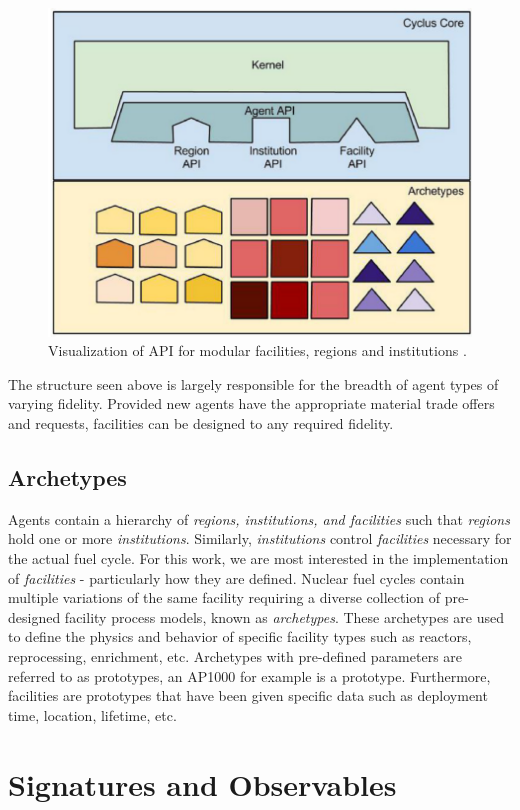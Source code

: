\begin{figure}
	\centering
	\includegraphics[width=0.7\linewidth]{images/cyclus-core}
	\caption{Visualization of \Cyclus API for modular facilities, regions and institutions \cite{huff_fundamental_2016}.}
	\label{fig:cyc-api}
\end{figure}

The structure seen above is largely responsible for the breadth of agent types of varying fidelity. Provided new agents have the appropriate material trade offers and requests,
facilities can be designed to any required fidelity.

\subsection{Archetypes}

Agents contain a hierarchy of \emph{regions, institutions, and facilities} such that \emph{regions} hold one or more \emph{institutions}. Similarly, \emph{institutions}
control \emph{facilities} necessary for the actual fuel cycle. For this work, we are most interested in the implementation of \emph{facilities} - particularly how they are defined.
Nuclear fuel cycles contain multiple variations of the same facility requiring a diverse collection of pre-designed facility process models, known as \emph{archetypes}.
These archetypes are used to define the physics and behavior of specific facility types such as reactors, reprocessing, enrichment, etc. Archetypes with pre-defined parameters are referred
to as prototypes, an AP1000 for example is a prototype. Furthermore, facilities are prototypes that have been given specific data such as deployment time, location, lifetime, etc.

\section{Signatures and Observables}

